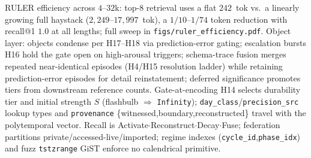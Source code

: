 RULER efficiency across $4$--$32$k: top-8 retrieval uses a flat $242$~tok vs.\ a linearly growing full haystack ($2{,}249$--$17{,}997$~tok), a $1/10$--$1/74$ token reduction with recall@1 $1.0$ at all lengths; full sweep in \texttt{figs/ruler\_efficiency.pdf}. Object layer: objects condense per H17--H18 via prediction-error gating; escalation bursts H16 hold the gate open on high-arousal triggers; schema-trace fusion merges repeated near-identical episodes (H4/H15 resolution ladder) while retaining prediction-error episodes for detail reinstatement; deferred significance promotes tiers from downstream reference counts. Gate-at-encoding H14 selects durability tier and initial strength $S$ (flashbulb $\Rightarrow$ \texttt{Infinity}); \texttt{day\_class}/\texttt{precision\_src} lookup types and \texttt{provenance} \{witnessed,boundary,reconstructed\} travel with the polytemporal vector. Recall is Activate$\cdot$Reconstruct$\cdot$Decay$\cdot$Fuse; federation partitions private/accessed-live/imported; regime indexes (\texttt{cycle\_id},\texttt{phase\_idx}) and fuzz \texttt{tstzrange} GiST enforce no calendrical primitive.